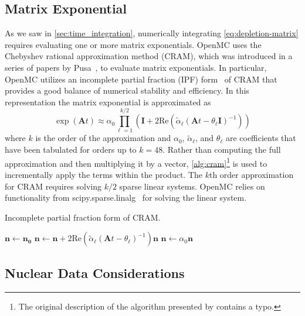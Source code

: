 \documentclass[3p,authoryear]{elsarticle}
\newcommand{\vect}[1]{\mathbf{#1}} %
\begin{document}
\subsection{Matrix Exponential}

As we saw in \cref{sec:time_integration}, numerically integrating
\cref{eq:depletion-matrix} requires evaluating one or more matrix exponentials.
OpenMC uses the Chebyshev rational approximation method (CRAM), which was
introduced in a series of papers by Pusa~\citep{pusa2010nse,pusa2011nse}, to
evaluate matrix exponentials. In particular, OpenMC utilizes an incomplete
partial fraction (IPF) form~\citep{pusa2016nse} of CRAM that provides a good
balance of numerical stability and efficiency. In this representation the matrix
exponential is approximated as
\begin{equation}
    \exp(\vect{A}t) \approx \alpha_0 \prod\limits_{\ell=1}^{k/2} \left (
    \vect{I} + 2 \text{Re} \left ( \widetilde{\alpha}_\ell \left (\vect{A}t
    - \theta_\ell \vect{I} \right )^{-1} \right ) \right )
\end{equation}
where $k$ is the order of the approximation and $\alpha_0$,
$\widetilde{\alpha}_\ell$, and $\theta_\ell$ are coefficients that have been
tabulated for orders up to $k=48$. Rather than computing the full approximation
and then multiplying it by a vector, \cref{alg:cram}\footnote{The original
description of the algorithm presented by \citet{pusa2016nse} contains a typo.}
is used to incrementally apply the terms within the product. The $k$th order
approximation for CRAM requires solving $k/2$ sparse linear systems. OpenMC
relies on functionality from scipy.sparse.linalg~\citep{virtanen2020nm} for
solving the linear system.
\begin{algorithm}[H]
  \caption{Incomplete partial fraction form of CRAM.}
  \label{alg:cram}
  \begin{algorithmic}[1]
    \State $\vect{n} \gets \vect{n_0}$
      \State $\vect{n} \gets \vect{n} + 2\text{Re}(\widetilde{\alpha}_\ell
        (\vect{A}t - \theta_\ell)^{-1})\vect{n}$
    \EndFor
    \State $\vect{n} \gets \alpha_0 \vect{n}$
  \end{algorithmic}
\end{algorithm}

\subsection{Nuclear Data Considerations}
\end{document}
